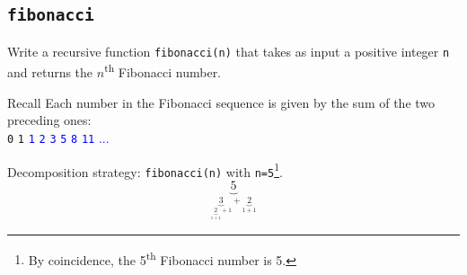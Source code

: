 \documentclass[t,handout,9pt]{beamer}
\begin{document}
\subsection{\texttt{fibonacci}}
\begin{frame}
\vfill
Write a recursive function \texttt{fibonacci(n)} that takes as input a positive integer \texttt{n} and returns the $n$\textsuperscript{th} Fibonacci number.
\vfill
\begin{block}{Recall}
Each number in the Fibonacci sequence is given by the sum of the two preceding ones:\\
\texttt{0} \texttt{1} \textcolor{blue}{\texttt{1} \texttt{2} \texttt{3} \texttt{5} \texttt{8} \texttt{11} ...}
\end{block}
\vfill
Decomposition strategy: \texttt{fibonacci(n)} with \texttt{n=5}\footnote{By coincidence, the 5\textsuperscript{th} Fibonacci number is 5.}.
\begin{equation*}
	\underbrace{5}_{\textstyle \underbrace{3}_{\textstyle\underbrace{2}_{\textstyle 1+1}+1} + \underbrace{2}_{\textstyle 1+1}}
\end{equation*}
\vfill
\end{frame}
%
\end{document}
